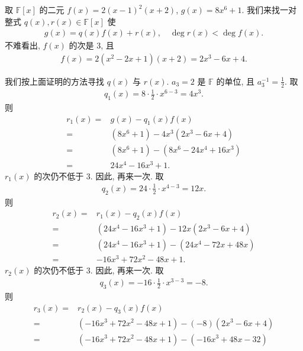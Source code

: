 \begin{example}
    取 $\mathbb{F}[x]$ 的二元 $f(x) = 2(x-1)^2 (x+2)$, $g(x) = 8x^6 + 1$. 我们来找一对整式 $q(x), r(x) \in \mathbb{F}[x]$ 使
    \begin{align*}
        g(x) = q(x) f(x) + r(x), \quad \deg r(x) < \deg f(x).
    \end{align*}
    不难看出, $f(x)$ 的次是 3, 且
    \begin{align*}
        f(x) = 2(x^2 - 2x + 1)(x+2) = 2x^3 - 6x + 4.
    \end{align*}

    我们按上面证明的方法寻找 $q(x)$ 与 $r(x)$. $a_3 = 2$ 是 $\mathbb{F}$ 的单位, 且 $a_3^{-1} = \frac12$. 取
    \begin{align*}
        q_1 (x) = 8\cdot \frac12 \cdot x^{6-3} = 4x^3.
    \end{align*}
    则
    \begin{align*}
        r_1 (x)
        = {} & g(x) - q_1(x) f(x)                  \\
        = {} & (8x^6 + 1) - 4x^3 (2x^3 - 6x + 4)   \\
        = {} & (8x^6 + 1) - (8x^6 - 24x^4 + 16x^3) \\
        = {} & 24x^4 - 16x^3 + 1.
    \end{align*}
    $r_1 (x)$ 的次仍不低于 $3$. 因此, 再来一次. 取
    \begin{align*}
        q_2 (x) = 24 \cdot \frac12 \cdot x^{4-3} = 12x.
    \end{align*}
    则
    \begin{align*}
        r_2 (x)
        = {} & r_1 (x) - q_2(x) f(x)                     \\
        = {} & (24x^4 - 16x^3 + 1) - 12x (2x^3 - 6x + 4) \\
        = {} & (24x^4 - 16x^3 + 1) - (24x^4 - 72x + 48x) \\
        = {} & -16x^3 + 72x^2 - 48x + 1.
    \end{align*}
    $r_2 (x)$ 的次仍不低于 $3$. 因此, 再来一次. 取
    \begin{align*}
        q_3 (x) = -16 \cdot \frac12 \cdot x^{3-3} = -8.
    \end{align*}
    则
    \begin{align*}
        r_3 (x)
        = {} & r_2 (x) - q_3(x) f(x)                             \\
        = {} & (-16x^3 + 72x^2 - 48x + 1) - (-8) (2x^3 - 6x + 4) \\
        = {} & (-16x^3 + 72x^2 - 48x + 1) - (-16x^3 + 48x - 32)  \\

\end{align*}
\end{example}
